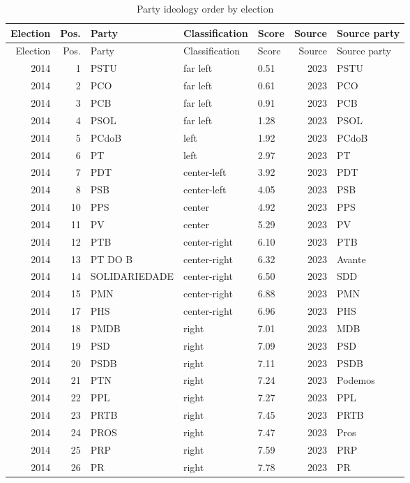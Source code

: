 \documentclass[11pt]{article}
\begin{document}
\begin{longtable}{rrlllrl}
\caption{Party ideology order by election}\label{tab:ideology-order-full}\\
\toprule
Election & Pos. & Party & Classification & Score & Source & Source party \\
\midrule
\endfirsthead
\toprule
Election & Pos. & Party & Classification & Score & Source & Source party \\
\midrule
\endhead
2014 & 1 & PSTU & far left & 0.51 & 2023 & PSTU \\
2014 & 2 & PCO & far left & 0.61 & 2023 & PCO \\
2014 & 3 & PCB & far left & 0.91 & 2023 & PCB \\
2014 & 4 & PSOL & far left & 1.28 & 2023 & PSOL \\
2014 & 5 & PCdoB & left & 1.92 & 2023 & PCdoB \\
2014 & 6 & PT & left & 2.97 & 2023 & PT \\
2014 & 7 & PDT & center-left & 3.92 & 2023 & PDT \\
2014 & 8 & PSB & center-left & 4.05 & 2023 & PSB \\
2014 & 10 & PPS & center & 4.92 & 2023 & PPS \\
2014 & 11 & PV & center & 5.29 & 2023 & PV \\
2014 & 12 & PTB & center-right & 6.10 & 2023 & PTB \\
2014 & 13 & PT DO B & center-right & 6.32 & 2023 & Avante \\
2014 & 14 & SOLIDARIEDADE & center-right & 6.50 & 2023 & SDD \\
2014 & 15 & PMN & center-right & 6.88 & 2023 & PMN \\
2014 & 17 & PHS & center-right & 6.96 & 2023 & PHS \\
2014 & 18 & PMDB & right & 7.01 & 2023 & MDB \\
2014 & 19 & PSD & right & 7.09 & 2023 & PSD \\
2014 & 20 & PSDB & right & 7.11 & 2023 & PSDB \\
2014 & 21 & PTN & right & 7.24 & 2023 & Podemos \\
2014 & 22 & PPL & right & 7.27 & 2023 & PPL \\
2014 & 23 & PRTB & right & 7.45 & 2023 & PRTB \\
2014 & 24 & PROS & right & 7.47 & 2023 & Pros \\
2014 & 25 & PRP & right & 7.59 & 2023 & PRP \\
2014 & 26 & PR & right & 7.78 & 2023 & PR \\

\end{longtable}
\end{document}
